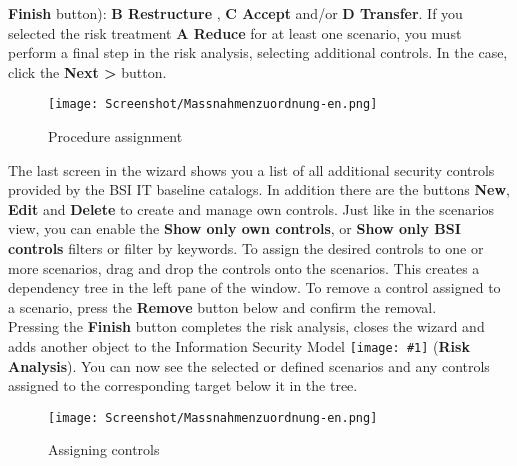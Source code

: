 \documentclass[a4paper,10pt]{book}
\newcommand{\icon}[1]{\texttt{[image: \#1]}}
\begin{document}
\textbf{Finish} button): \textbf{B Restructure} , \textbf{C Accept} and/or \textbf{D Transfer}.
If you selected the risk treatment \textbf{A Reduce} for at least one scenario, you must perform a
final step in the risk analysis, selecting additional controls. In the case, click the \textbf{Next \textgreater}
button.
\newline
\begin{figure}[htb!]
  \centering
  \texttt{[image: Screenshot/Massnahmenzuordnung-en.png]}
  \caption{\label{Procedure assignment} Procedure assignment}
\end{figure}
\newline
The last screen in the wizard shows you a list of all additional security controls provided by
the BSI IT baseline catalogs. In addition there are the buttons \textbf{New}, \textbf{Edit} and \textbf{Delete} to create and manage own controls. Just like in the scenarios view, you can enable the \textbf{Show only own controls}, or
\textbf{Show only BSI controls} filters or filter by keywords. To assign the desired controls to one or more scenarios, drag and drop the controls onto the scenarios. This creates a dependency
tree in the left pane of the window. To remove a control assigned to a scenario, press the \textbf{Remove}
button below and confirm the removal.
\newline\\
Pressing the \textbf{Finish} button completes the risk analysis, closes the wizard and adds another
object to the Information Security Model \icon{Icon/Risikoanalyse.png}
(\textbf{Risk Analysis}). You can now see the selected or defined scenarios
and any controls assigned to the corresponding target below it in the tree.
\begin{figure}[htb!]
  \centering
  \texttt{[image: Screenshot/Massnahmenzuordnung-en.png]}
  \caption{\label{Assigning controls} Assigning controls}
\end{figure}
\end{document}
